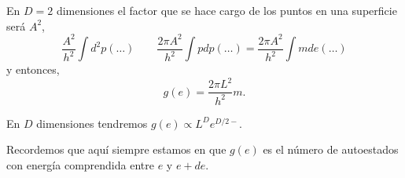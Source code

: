 \documentclass[10pt,oneside]{CBFT_book}
\begin{document}
En $D=2$ dimensiones el factor que se hace cargo de los puntos en una superficie será $A^2$,
\[
	\frac{A^2}{h^2} \int d^2p (\ldots) \qquad  
	\frac{2 \pi A^2}{h^2} \int p dp (\ldots) = \frac{2 \pi A^2}{h^2} \int m de (\ldots)
\]
y entonces,
\[
	g(e) = \frac{2 \pi L^2}{h^2}m.
\]

En $D$ dimensiones tendremos $ g(e) \propto L^D e^{D/2-}$.

Recordemos que aquí siempre estamos en que $g(e)$ es el número de autoestados con energía comprendida
entre $e$ y $e+de$.







\end{document}
